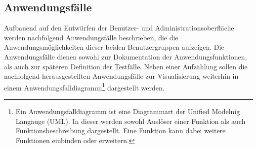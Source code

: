 \subsection{Anwendungsfälle}
\label{sec:Anwendungsfaelle}

Aufbauend auf den Entwürfen der Benutzer- und Administrationsoberfläche werden
nachfolgend Anwendungsfälle beschrieben, die die Anwendungsmöglichkeiten
dieser beiden Benutzergruppen aufzeigen. Die Anwendungsfälle dienen sowohl zur
Dokumentation der Anwendungsfunktionen, als auch zur späteren Definition der
Testfälle. Neben einer Aufzählung sollen die nachfolgend herausgestellten
Anwendungsfälle zur Visualisierung weiterhin in einem
Anwendungsfalldiagramm\footnote{Ein Anwendungsfalldiagramm ist eine Diagrammart
der Unified Modelnig Langauge (UML). In dieser werden sowohl Auslöser einer
Funktion als auch Funktionsbeschreibung dargestellt. Eine Funktion kann dabei
weitere Funktionen einbinden oder erweitern.} dargestellt werden.


